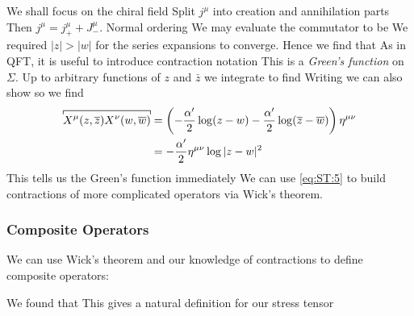 \documentclass{article}
\begin{document}
We shall focus on the chiral field 
Split $j^\mu$ into creation and annihilation parts 
Then $j^\mu = j_+^\mu + J_-^\mu$. Normal ordering 
We may evaluate the commutator to be 
We required $|z| > |w|$ for the series expansions to converge. Hence we find that 
As in QFT, it is useful to introduce contraction notation 
This is a \emph{Green's function} on $\Sigma$. Up to arbitrary functions of $z$ and $\bar{z}$ we integrate to find 
Writing 
we can also show 
so we find 
\begin{align}
\overbracket[0.5pt]{X^\mu(z,\bar{z})X^\nu(w,\bar{w})} &= \left( -\frac{\cst}{2} \log(z-w) - \frac{\cst}{2} \log(\bar{z}-\bar{w} ) \right) \eta^{\mu\nu} \\
&= -\frac{\cst}{2} \eta^{\mu\nu} \log|z-w|^2 \label{eq:ST:5}
\end{align}
This tells us the Green's function immediately 
We can use \ref{eq:ST:5} to build contractions of more complicated operators via Wick's theorem. 

\subsubsection*{Composite Operators}
We can use Wick's theorem and our knowledge of contractions to define composite operators: 
\begin{example}
We found that 
This gives a natural definition for our stress tensor 
\end{example}
\end{document}
